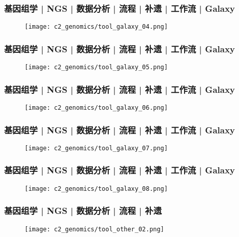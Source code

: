 \begin{frame}
  \frametitle{基因组学 | NGS | 数据分析 | 流程 | 补遗 | 工作流 | Galaxy}
  \begin{figure}
    \centering
    \texttt{[image: c2\_genomics/tool\_galaxy\_04.png]}
  \end{figure}
\end{frame}

\begin{frame}
  \frametitle{基因组学 | NGS | 数据分析 | 流程 | 补遗 | 工作流 | Galaxy}
  \begin{figure}
    \centering
    \texttt{[image: c2\_genomics/tool\_galaxy\_05.png]}
  \end{figure}
\end{frame}

\begin{frame}
  \frametitle{基因组学 | NGS | 数据分析 | 流程 | 补遗 | 工作流 | Galaxy}
  \begin{figure}
    \centering
    \texttt{[image: c2\_genomics/tool\_galaxy\_06.png]}
  \end{figure}
\end{frame}

\begin{frame}
  \frametitle{基因组学 | NGS | 数据分析 | 流程 | 补遗 | 工作流 | Galaxy}
  \begin{figure}
    \centering
    \texttt{[image: c2\_genomics/tool\_galaxy\_07.png]}
  \end{figure}
\end{frame}

\begin{frame}
  \frametitle{基因组学 | NGS | 数据分析 | 流程 | 补遗 | 工作流 | Galaxy}
  \begin{figure}
    \centering
    \texttt{[image: c2\_genomics/tool\_galaxy\_08.png]}
  \end{figure}
\end{frame}

\begin{frame}
  \frametitle{基因组学 | NGS | 数据分析 | 流程 | 补遗}
  \begin{figure}
    \centering
    \texttt{[image: c2\_genomics/tool\_other\_02.png]}
  \end{figure}
\end{frame}

